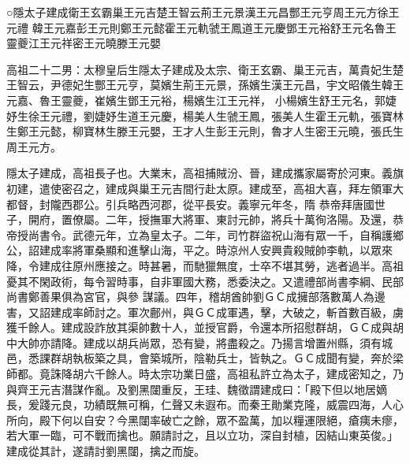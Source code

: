 
\begin{pinyinscope}

 ○隱太子建成衛王玄霸巢王元吉楚王智云荊王元景漢王元昌酆王元亨周王元方徐王元禮
 韓王元嘉彭王元則鄭王元懿霍王元軌虢王鳳道王元慶鄧王元裕舒王元名魯王靈夔江王元祥密王元曉滕王元嬰



 高祖二十二男：太穆皇后生隱太子建成及太宗、衛王玄霸、巢王元吉，萬貴妃生楚王智云，尹德妃生酆王元亨，莫嬪生荊王元景，孫嬪生漢王元昌，宇文昭儀生韓王元嘉、魯王靈夔，崔嬪生鄧王元裕，楊嬪生江王元祥，
 小楊嬪生舒王元名，郭婕妤生徐王元禮，劉婕妤生道王元慶，楊美人生虢王鳳，張美人生霍王元軌，張寶林生鄭王元懿，柳寶林生滕王元嬰，王才人生彭王元則，魯才人生密王元曉，張氏生周王元方。



 隱太子建成，高祖長子也。大業末，高祖捕賊汾、晉，建成攜家屬寄於河東。義旗初建，遣使密召之，建成與巢王元吉間行赴太原。建成至，高祖大喜，拜左領軍大都督，封隴西郡公。引兵略西河郡，從平長安。義寧元年冬，隋
 恭帝拜唐國世子，開府，置僚屬。二年，授撫軍大將軍、東討元帥，將兵十萬徇洛陽。及還，恭帝授尚書令。武德元年，立為皇太子。二年，司竹群盜祝山海有眾一千，自稱護鄉公，詔建成率將軍桑顯和進擊山海，平之。時涼州人安興貴殺賊帥李軌，以眾來降，令建成往原州應接之。時甚暑，而馳獵無度，士卒不堪其勞，逃者過半。高祖憂其不閑政術，每令習時事，自非軍國大務，悉委決之。又遣禮部尚書李綱、民部尚書鄭善果俱為宮官，與參
 謀議。四年，稽胡酋帥劉ＧＣ成擁部落數萬人為邊害，又詔建成率師討之。軍次鄜州，與ＧＣ成軍遇，擊，大破之，斬首數百級，虜獲千餘人。建成設詐放其渠帥數十人，並授官爵，令還本所招慰群胡，ＧＣ成與胡中大帥亦請降。建成以胡兵尚眾，恐有變，將盡殺之。乃揚言增置州縣，須有城邑，悉課群胡執板築之具，會築城所，陰勒兵士，皆執之。ＧＣ成聞有變，奔於梁師都。竟誅降胡六千餘人。時太宗功業日盛，高祖私許立為太子，建成密知之，乃
 與齊王元吉潛謀作亂。及劉黑闥重反，王珪、魏徵謂建成曰：「殿下但以地居嫡長，爰踐元良，功績既無可稱，仁聲又未遐布。而秦王勛業克隆，威震四海，人心所向，殿下何以自安？今黑闥率破亡之餘，眾不盈萬，加以糧運限絕，瘡痍未瘳，若大軍一臨，可不戰而擒也。願請討之，且以立功，深自封植，因結山東英俊。」建成從其計，遂請討劉黑闥，擒之而旋。




\end{pinyinscope}

